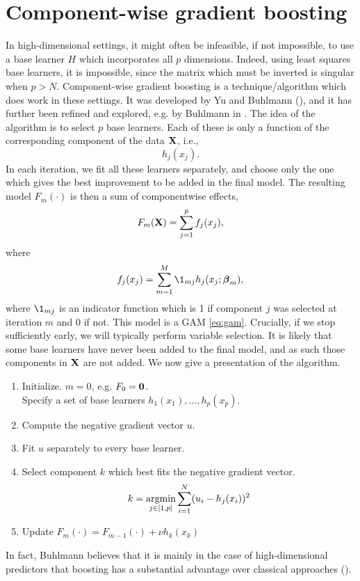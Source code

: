 \section{Component-wise gradient boosting}
In high-dimensional settings, it might often be infeasible, if not impossible, to use a base learner $H$ which incorporates all $p$ dimensions. Indeed, using least squares base learners, it is impossible, since the matrix which must be inverted is singular when $p>N$. Component-wise gradient boosting is a technique/algorithm which does work in these settings. It was developed by Yu and Buhlmann (\cite{buhlmann-yu}), and it has further been refined and explored, e.g. by Buhlmann in \cite{buhlmann2006}. The idea of the algorithm is to select $p$ base learners. Each of these is only a function of the corresponding component of the data $\mathbf{X}$, i.e.,
\begin{equation}
    h_j(x_j).
\end{equation}
In each iteration, we fit all these learners separately, and choose only the one which gives the best improvement to be added in the final model. The resulting model $F_m(\cdot)$ is then a sum of componentwise effects,
\begin{equation}
    F_m(\mathbf{X})=\sum_{j=1}^pf_j(x_j),
\end{equation}
where
\begin{equation}
    f_j(x_j)=\sum_{m=1}^M\1_{mj}h_j(x_j;\bbeta_m),
\end{equation}
where $\1_{mj}$ is an indicator function which is 1 if component $j$ was selected at iteration $m$ and 0 if not.
This model is a GAM \eqref{eq:gam}. Crucially, if we stop sufficiently early, we will typically perform variable selection. It is likely that some base learners have never been added to the final model, and as such those components in $\mathbf{X}$ are not added. We now give a presentation of the algorithm.
\begin{enumerate}
    \item Initialize. $m=0$, e.g. $F_0=\mathbf{0}$.\\
    Specify a set of base learners $h_1(x_1),\dotsc,h_p(x_p)$.
    \item Compute the negative gradient vector $u$.
    \item Fit $u$ separately to every base learner.
    \item Select component $k$ which best fits the negative gradient vector.
        \begin{equation}
            k=\operatorname*{argmin}_{j\in[1,p]}\sum_{i=1}^N(u_i-h_j(x_i))^2
        \end{equation}
    \item Update $F_m(\cdot)=F_{m-1}(\cdot)+\nu h_k(x_k)$
\end{enumerate}
In fact, Buhlmann believes that it is mainly in the case of high-dimensional predictors that boosting has a substantial advantage over classical approaches (\cite{buhlmann2006}).